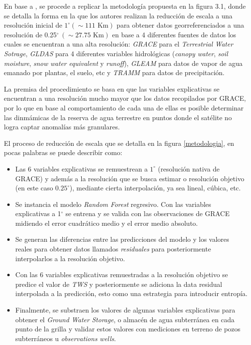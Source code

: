 En base a \cite{11}, se procede a replicar la metodología propuesta en la figura 3.1, donde se detalla
la forma en la que los autores realizan la reducción de escala a una resolución inicial de $1^{\circ} (\sim 111 \text{ Km})$
para obtener datos georreferenciados a una resolución de 0.25$^{\circ}~(\sim 27 \text{.} 75 \text{ Km})$ en base a 4 diferentes fuentes de datos los cuales se encuentran a una alta resolución: 
\textit{GRACE} para el \textit{Terrestrial Water Sotrage}, \textit{GLDAS} para 4 diferentes variables hidrológicas (\textit{canopy water}, \textit{soil moisture}, 
\textit{snow water equivalent} y \textit{runoff}), \textit{GLEAM} para datos 
de vapor de agua emanado por plantas, el suelo, etc y \textit{TRAMM} para datos de precipitación.

La premisa del procedimiento se basa en que las variables explicativas se encuentran a una resolución mucho mayor que los datos recopilados por GRACE,
por lo que en base al comportamiento de cada una de ellas es posible determinar las dinmámicas de la reserva de agua terrestre en puntos donde el satélite no 
logra captar anomalías más granulares.

El proceso de reducción de escala que se detalla en la figura \ref{metodologia}, en pocas palabras se puede describir
como:
\begin{itemize}

    \item Las 6 variables explicativas se remuestrean a $1^{\circ}$ (resolución 
    nativa de GRACE) y además a la resolución que se busca estimar o resolución objetivo (en este caso $0\text{.}25^{\circ}$), mediante 
    cierta interpolación, ya sea lineal, cúbica, etc.

    \item Se instancia el modelo \textit{Random Forest} regresivo. Con las variables explicativas a 1$^{\circ}$ se entrena y se valida
    con las observaciones de GRACE midiendo el error cuadrático medio y el error medio absoluto.
    
    \item Se generan las diferencias entre las predicciones del modelo y los valores reales para obtener
    datos llamados \textit{residuales} para posteriormente interpolarlos a la resolución objetivo.

    \item Con las 6 variables explicativas remuestradas a la resolución objetivo se predice el valor de \textit{TWS}
    y posteriormente se adiciona la data residual interpolada a la predicción, esto como una estrategia para introducir entropía.
    
    \item Finalmente, se substraen los valores de algunas variables explicativas para obtener el 
    \textit{Ground Water Storage}, o almacén de agua subterránea en cada punto de la grilla y validar estos valores con
    mediciones en terreno de pozos subterráneos u \textit{observations wells}.
    
\end{itemize}


